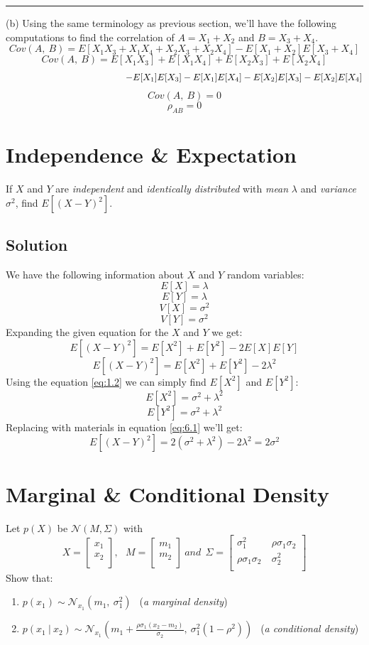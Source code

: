 \documentclass[12pt]{article}
\numberwithin{equation}{section}
\numberwithin{table}{section}
\numberwithin{figure}{section}
\begin{document}
\noindent\rule{\textwidth}{.5pt}
(b) Using the same terminology as previous section, we'll have the following computations to find the correlation of $A = X_1 + X_2$ and $B = X_3 + X_4$.
$$
Cov(A,\ B) = E[X_1X_3 + X_1X_4 + X_2X_3 + X_2X_4] - E[X_1 + X_2]E[X_3 + X_4]
$$
$$
Cov(A,\ B) = E[X_1X_3] + E[X_1X_4] + E[X_2X_3] + E[X_2X_4]
$$
$$
\hspace{4.5cm}- E[X_1]E[X_3] - E[X_1]E[X_4] - E[X_2]E[X_3] - E[X_2]E[X_4]
$$
$$
	Cov(A,\ B) = 0
$$
$$
\boxed{\rho_{AB} =	0}
$$

\section{Independence \& Expectation}
If $X$ and $Y$ are \textit{independent} and \textit{identically distributed} with \textit{mean} $\lambda$ and \textit{variance} $\sigma^2$, find $E[(X-Y)^2]$.

\subsection*{Solution}
We have the following information about $X$ and $Y$ random variables:\\
$$
	E[X] = \lambda
$$
$$
	E[Y] = \lambda
$$
$$
	V[X] = \sigma^2
$$
$$
	V[Y] = \sigma^2
$$
Expanding the given equation for the $X$ and $Y$ we get:
$$
	E[(X-Y)^2] = E[X^2] + E[Y^2] - 2E[X]E[Y]
$$	
\begin{equation}\label{eq:6.1}
E[(X-Y)^2] = E[X^2] + E[Y^2] - 2\lambda^2
\end{equation}
Using the equation \ref{eq:1.2} we can simply find $E[X^2]$ and $E[Y^2]$:
$$
	E[X^2] = \sigma^2 + \lambda^2
$$
$$
	E[Y^2] = \sigma^2 + \lambda^2
$$
Replacing with materials in equation \ref{eq:6.1} we'll get:
$$
	\boxed{E[(X-Y)^2] = 2(\sigma^2 + \lambda^2)- 2\lambda^2 = 2\sigma^2}	
$$
\section{Marginal \& Conditional Density}
Let $p(X)$ be $\mathcal{N}(M, \Sigma)$ with
$$
	X = \begin{bmatrix}
	x_1\\	
	x_2\\
	\end{bmatrix},\ \ \ 
	M = \begin{bmatrix}
	m_1\\	
	m_2\\
	\end{bmatrix}\ and\ \ 
	\Sigma = \begin{bmatrix}
	\sigma_1^2 & \rho\sigma_1\sigma_2\\	
	\rho\sigma_1\sigma_2\ & \sigma_2^2\\
	\end{bmatrix}
$$
Show that:
\begin{enumerate}[label=(\alph*)]
	\item $p(x_1) \sim \mathcal{N}_{x_1}(m_1,\ \sigma_1^2)\ \ $  (\textit{a marginal density})
	\item $p(x_1\ |\ x_2) \sim \mathcal{N}_{x_1}(m_1 + \frac{\rho\sigma_1(x_2 - m_2)}{\sigma_2},\ \sigma_1^2(1-\rho^2))\ \ $ (\textit{a conditional density})
\end{enumerate}
\end{document}
